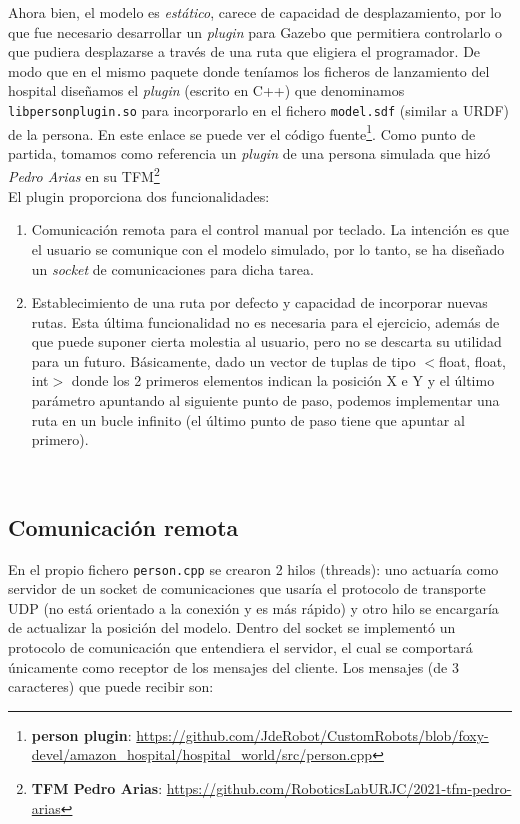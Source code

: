 Ahora bien, el modelo es \textit{estático}, carece de capacidad de desplazamiento, por lo que fue necesario desarrollar un \textit{plugin} para Gazebo que permitiera controlarlo o que pudiera desplazarse a través de una ruta que eligiera el programador. De modo que en el mismo paquete donde teníamos los ficheros de lanzamiento del hospital diseñamos el \textit{plugin} (escrito en C++) que denominamos \texttt{libpersonplugin.so} para incorporarlo en el fichero \texttt{model.sdf} (similar a URDF) de la persona. En este enlace se puede ver el código fuente\footnote{\textbf{person plugin}: \url{https://github.com/JdeRobot/CustomRobots/blob/foxy-devel/amazon_hospital/hospital_world/src/person.cpp}}. Como punto de partida, tomamos como referencia un \textit{plugin} de una persona simulada que hizó \textit{Pedro Arias} en su TFM\footnote{\textbf{TFM Pedro Arias}: \url{https://github.com/RoboticsLabURJC/2021-tfm-pedro-arias}}\\

El plugin proporciona dos funcionalidades:
\begin{enumerate}
	\item Comunicación remota para el control manual por teclado. La intención es que el usuario se comunique con el modelo simulado, por lo tanto, se ha diseñado un \textit{socket} de comunicaciones para dicha tarea.
	\item Establecimiento de una ruta por defecto y capacidad de incorporar nuevas rutas. Esta última funcionalidad no es necesaria para el ejercicio, además de que puede suponer cierta molestia al usuario, pero no se descarta su utilidad para un futuro. Básicamente, dado un vector de tuplas de tipo $<$float, float, int$>$ donde los 2 primeros elementos indican la posición X e Y y el último parámetro apuntando al siguiente punto de paso, podemos implementar una ruta en un bucle infinito (el último punto de paso tiene que apuntar al primero).
\end{enumerate}\




\subsection{Comunicación remota}
\label{subsec:comunicacion_remota}

En el propio fichero \texttt{person.cpp} se crearon 2 hilos (threads): uno actuaría como servidor de un socket de comunicaciones que usaría el protocolo de transporte UDP (no está orientado a la conexión y es más rápido) y otro hilo se encargaría de actualizar la posición del modelo. Dentro del socket se implementó un protocolo de comunicación que entendiera el servidor, el cual se comportará únicamente como receptor de los mensajes del cliente. Los mensajes (de 3 caracteres) que puede recibir son:\\

